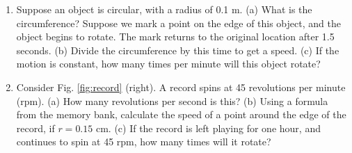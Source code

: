 \documentclass{article}
\begin{document}
\begin{enumerate}
\item Suppose an object is circular, with a radius of 0.1 m. (a) What is the circumference?  Suppose we mark a point on the edge of this object, and the object begins to rotate.  The mark returns to the original location after 1.5 seconds.  (b) Divide the circumference by this time to get a speed.  (c)  If the motion is constant, how many times per minute will this object rotate? \\ \vspace{1cm}
\item Consider Fig. \ref{fig:record} (right).  A record spins at 45 revolutions per minute (rpm).  (a) How many revolutions per second is this? (b) Using a formula from the memory bank, calculate the speed of a point around the edge of the record, if $r = 0.15$ cm. (c) If the record is left playing for one hour, and continues to spin at 45 rpm, how many times will it rotate?
\end{enumerate}
\end{document}
